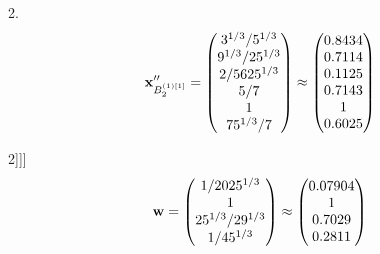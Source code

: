 \documentclass[10pt,a4paper]{article}
\begin{document}
	2.
	\[
		\bold{x}''_{B_2^{(1)[1]}} = 
		\begin{pmatrix}
			{{3^ {1 / 3}}} / {{5^ {1 / 3}}} \\
			{{9^ {1 / 3}}} / {{25^ {1 / 3}}} \\
			{{2}} / {{5625^ {1 / 3}}} \\
			{{5}} / {{7}} \\
			{1}{} \\
			{{75^ {1 / 3}}} / {{7}} \\
		\end{pmatrix}
		\approx
		\begin{pmatrix}
			0.8434   \\
			0.7114   \\
			0.1125   \\
			0.7143   \\
			1        \\
			0.6025   \\
		\end{pmatrix}
	\]

	2]]]
	\[
		\bold{w} = 
		\begin{pmatrix}
			{1} / {{2025^ {1 / 3}}} \\
			{1}{} \\
			{{25^ {1 / 3}}} / {{2}{9^ {1 / 3}}} \\
			{1} / {{45^ {1 / 3}}} \\
		\end{pmatrix}
		\approx
		\begin{pmatrix}
			0.07904  \\
			1        \\
			0.7029   \\
			0.2811   \\
		\end{pmatrix}
	\]
\end{document}
